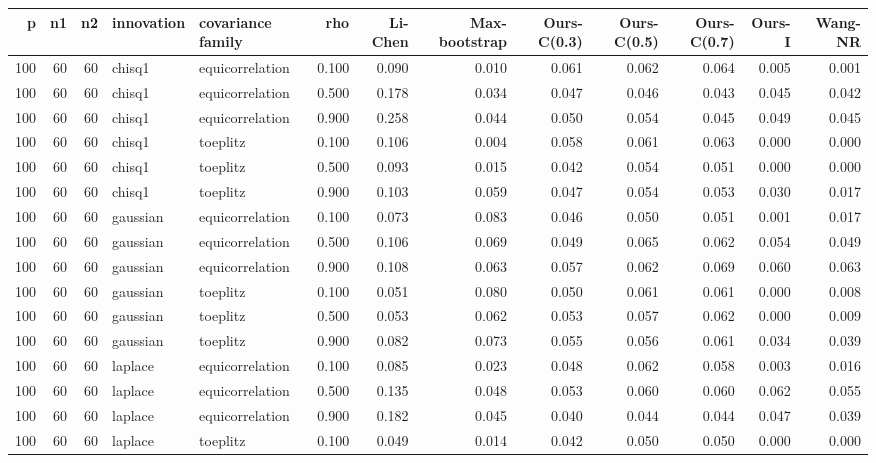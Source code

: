 \begin{tabular}{rrrllrrrrrrrr}
\toprule
p & n1 & n2 & innovation & covariance family & rho & Li-Chen & Max-bootstrap & Ours-C(0.3) & Ours-C(0.5) & Ours-C(0.7) & Ours-I & Wang-NR \\
\midrule
100 & 60 & 60 & chisq1 & equicorrelation & 0.100 & 0.090 & 0.010 & 0.061 & 0.062 & 0.064 & 0.005 & 0.001 \\
100 & 60 & 60 & chisq1 & equicorrelation & 0.500 & 0.178 & 0.034 & 0.047 & 0.046 & 0.043 & 0.045 & 0.042 \\
100 & 60 & 60 & chisq1 & equicorrelation & 0.900 & 0.258 & 0.044 & 0.050 & 0.054 & 0.045 & 0.049 & 0.045 \\
100 & 60 & 60 & chisq1 & toeplitz & 0.100 & 0.106 & 0.004 & 0.058 & 0.061 & 0.063 & 0.000 & 0.000 \\
100 & 60 & 60 & chisq1 & toeplitz & 0.500 & 0.093 & 0.015 & 0.042 & 0.054 & 0.051 & 0.000 & 0.000 \\
100 & 60 & 60 & chisq1 & toeplitz & 0.900 & 0.103 & 0.059 & 0.047 & 0.054 & 0.053 & 0.030 & 0.017 \\
100 & 60 & 60 & gaussian & equicorrelation & 0.100 & 0.073 & 0.083 & 0.046 & 0.050 & 0.051 & 0.001 & 0.017 \\
100 & 60 & 60 & gaussian & equicorrelation & 0.500 & 0.106 & 0.069 & 0.049 & 0.065 & 0.062 & 0.054 & 0.049 \\
100 & 60 & 60 & gaussian & equicorrelation & 0.900 & 0.108 & 0.063 & 0.057 & 0.062 & 0.069 & 0.060 & 0.063 \\
100 & 60 & 60 & gaussian & toeplitz & 0.100 & 0.051 & 0.080 & 0.050 & 0.061 & 0.061 & 0.000 & 0.008 \\
100 & 60 & 60 & gaussian & toeplitz & 0.500 & 0.053 & 0.062 & 0.053 & 0.057 & 0.062 & 0.000 & 0.009 \\
100 & 60 & 60 & gaussian & toeplitz & 0.900 & 0.082 & 0.073 & 0.055 & 0.056 & 0.061 & 0.034 & 0.039 \\
100 & 60 & 60 & laplace & equicorrelation & 0.100 & 0.085 & 0.023 & 0.048 & 0.062 & 0.058 & 0.003 & 0.016 \\
100 & 60 & 60 & laplace & equicorrelation & 0.500 & 0.135 & 0.048 & 0.053 & 0.060 & 0.060 & 0.062 & 0.055 \\
100 & 60 & 60 & laplace & equicorrelation & 0.900 & 0.182 & 0.045 & 0.040 & 0.044 & 0.044 & 0.047 & 0.039 \\
100 & 60 & 60 & laplace & toeplitz & 0.100 & 0.049 & 0.014 & 0.042 & 0.050 & 0.050 & 0.000 & 0.000 \\

\end{tabular}
